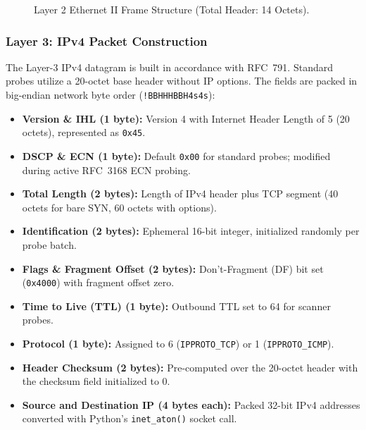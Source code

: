 \begin{figure}[htbp]
\centering
{}
\caption{Layer 2 Ethernet II Frame Structure (Total Header: 14 Octets).}
\label{fig:frame_eth}
\end{figure}

\subsubsection{Layer 3: IPv4 Packet Construction}
The Layer-3 IPv4 datagram is built in accordance with RFC~791. Standard probes utilize a 20-octet
base header without IP options. The fields are packed in big-endian network byte order
(\texttt{!BBHHHBBH4s4s}):
\begin{itemize}
    \item \textbf{Version \& IHL (1 byte):} Version 4 with Internet Header Length of 5 (20 octets), represented as \texttt{0x45}.
    \item \textbf{DSCP \& ECN (1 byte):} Default \texttt{0x00} for standard probes; modified during active RFC~3168 ECN probing.
    \item \textbf{Total Length (2 bytes):} Length of IPv4 header plus TCP segment (40 octets for bare SYN, 60 octets with options).
    \item \textbf{Identification (2 bytes):} Ephemeral 16-bit integer, initialized randomly per probe batch.
    \item \textbf{Flags \& Fragment Offset (2 bytes):} Don't-Fragment (DF) bit set (\texttt{0x4000}) with fragment offset zero.
    \item \textbf{Time to Live (TTL) (1 byte):} Outbound TTL set to 64 for scanner probes.
    \item \textbf{Protocol (1 byte):} Assigned to 6 (\texttt{IPPROTO\_TCP}) or 1 (\texttt{IPPROTO\_ICMP}).
    \item \textbf{Header Checksum (2 bytes):} Pre-computed over the 20-octet header with the checksum field initialized to 0.
    \item \textbf{Source and Destination IP (4 bytes each):} Packed 32-bit IPv4 addresses converted with Python's \texttt{inet\_aton()} socket call.
\end{itemize}

